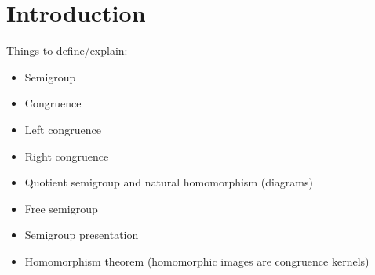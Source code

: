 \chapter{Introduction}
\label{chap:intro}

Things to define/explain:

\begin{itemize}
\item Semigroup
\item Congruence
\item Left congruence
\item Right congruence
\item Quotient semigroup and natural homomorphism (diagrams)
\item Free semigroup
\item Semigroup presentation
\item Homomorphism theorem (homomorphic images are congruence kernels)
\end{itemize}

